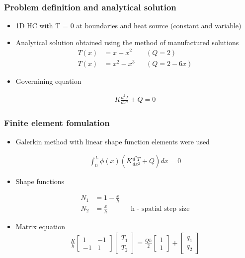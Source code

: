 
\begin{frame}
	\frametitle{Problem definition and analytical solution}
	\begin{itemize}
		\item 1D HC with T = 0 at boundaries and heat source (constant and variable)
			\vspace{1cm}
		\item Analytical solution obtained using the method of manufactured solutions
			\begin{align*}
				T(x) &= x - x^2 && (Q = 2) \\
				T(x) &= x^2 - x^3 && (Q = 2 - 6x)
			\end{align*}

		\item Governining equation

			\begin{align*}
				K\frac{d^2 T}{d x^2} + Q = 0
			\end{align*}
	\end{itemize}
\end{frame}



\begin{frame}
	\frametitle{Finite element fomulation}
	\begin{itemize}
		\item Galerkin method with linear shape function elements were used

			\begin{align*}
				\int_{0}^{L} \phi(x) \left(K\frac{d^2 T}{d x^2} + Q  \right) dx = 0
			\end{align*}

		\item Shape functions

			\begin{align*}
				N_1 &= 1 - \frac{x}{h} \\
				N_2 &= \frac{x}{h} && \text{h - spatial step size}
			\end{align*}

		\item Matrix equation
			\begin{align*}
				\frac{K}{h} \begin{bmatrix} 1 & -1 \\ -1 & 1 \end{bmatrix} \begin{bmatrix} T_1 \\ T_2 \end{bmatrix} = \frac{Q h}{2} \begin{bmatrix} 1 \\ 1 \end{bmatrix} + \begin{bmatrix} q_1 \\ q_2 \end{bmatrix}
			\end{align*}

	\end{itemize}
\end{frame}

